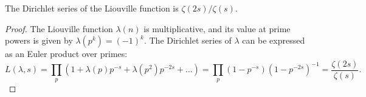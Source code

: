 \begin{theorem}
\label{LSeries_liouville_eq}
\leanok
The Dirichlet series of the Liouville function is $\zeta(2s)/\zeta(s)$.
\end{theorem}
\begin{proof}
The Liouville function $\lambda(n)$ is multiplicative, and its value at prime powers is given by $\lambda(p^k) = (-1)^k$. The Dirichlet series of $\lambda$ can be expressed as an Euler product over primes:
\[
L(\lambda, s) = \prod_{p} \left(1 + \lambda(p)p^{-s} + \lambda(p^2)p^{-2s} + \ldots\right) = \prod_{p} \left(1 - p^{-s}\right) \left(1 - p^{-2s}\right)^{-1} = \frac{\zeta(2s)}{\zeta(s)}.
\]
\end{proof}
